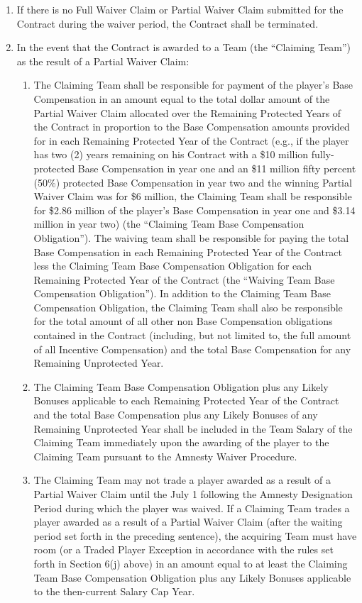 \documentclass[
]{book}
\providecommand{\tightlist}{%
  \setlength{\itemsep}{0pt}\setlength{\parskip}{0pt}}
\begin{document}
\begin{enumerate}
\begin{enumerate}
\begin{enumerate}
    \item
      If there is no Full Waiver Claim or Partial Waiver Claim submitted for the Contract during the waiver period, the Contract shall be terminated.
    \item
      In the event that the Contract is awarded to a Team (the ``Claiming Team'') as the result of a Partial Waiver Claim:

      \begin{enumerate}
      \def\labelenumiv{(\Alph{enumiv})}
      \tightlist
      \item
        The Claiming Team shall be responsible for payment of the player's Base Compensation in an amount equal to the total dollar amount of the Partial Waiver Claim allocated over the Remaining Protected Years of the Contract in proportion to the Base Compensation amounts provided for in each Remaining Protected Year of the Contract (e.g., if the player has two (2) years remaining on his Contract with a \$10 million fully-protected Base Compensation in year one and an \$11 million fifty percent (50\%) protected Base Compensation in year two and the winning Partial Waiver Claim was for \$6 million, the Claiming Team shall be responsible for \$2.86 million of the player's Base Compensation in year one and \$3.14 million in year two) (the ``Claiming Team Base Compensation Obligation''). The waiving team shall be responsible for paying the total Base Compensation in each Remaining Protected Year of the Contract less the Claiming Team Base Compensation Obligation for each Remaining Protected Year of the Contract (the ``Waiving Team Base Compensation Obligation''). In addition to the Claiming Team Base Compensation Obligation, the Claiming Team shall also be responsible for the total amount of all other non Base Compensation obligations contained in the Contract (including, but not limited to, the full amount of all Incentive Compensation) and the total Base Compensation for any Remaining Unprotected Year.
      \item
        The Claiming Team Base Compensation Obligation plus any Likely Bonuses applicable to each Remaining Protected Year of the Contract and the total Base Compensation plus any Likely Bonuses of any Remaining Unprotected Year shall be included in the Team Salary of the Claiming Team immediately upon the awarding of the player to the Claiming Team pursuant to the Amnesty Waiver Procedure.
      \item
        The Claiming Team may not trade a player awarded as a result of a Partial Waiver Claim until the July 1 following the Amnesty Designation Period during which the player was waived. If a Claiming Team trades a player awarded as a result of a Partial Waiver Claim (after the waiting period set forth in the preceding sentence), the acquiring Team must have room (or a Traded Player Exception in accordance with the rules set forth in Section 6(j) above) in an amount equal to at least the Claiming Team Base Compensation Obligation plus any Likely Bonuses applicable to the then-current Salary Cap Year.

\end{enumerate}
\end{enumerate}
\end{enumerate}
\end{enumerate}
\end{document}
